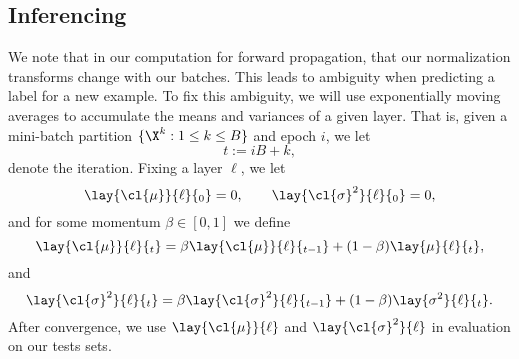 \begin{comment}
\begin{remark}
	Note that it may seem that $\mu$ and $\sigma$ depend on the variable $z$, but they actually depend on the full set of potential values, and are hence constants.  NOT TRUE
\end{remark}






	
\end{comment}



\subsection{Inferencing}
We note that in our computation for forward propagation, that our normalization transforms change with our batches.  This leads to ambiguity when predicting a label for a new example.  To fix this ambiguity, we will use exponentially moving averages to accumulate the means and variances of a given layer.  That is, given a mini-batch partition $\{\X^k:1\leq k \leq B\}$ and epoch $i$, we let
$$t:=iB + k,$$
denote the iteration.  Fixing a layer $\ell$, we let
$$\lay{\cl{\mu}}{\ell}{_0}=0,\qquad\lay{\cl{\sigma}^2}{\ell}{_0}=0,$$
and for some momentum $\beta\in[0,1]$ we define
$$\lay{\cl{\mu}}{\ell}{_t}=\beta\lay{\cl{\mu}}{\ell}{_{t-1}}+(1-\beta)\lay{\mu}{\ell}{_t},$$
and
$$\lay{\cl{\sigma}^2}{\ell}{_t}=\beta\lay{\cl{\sigma}^2}{\ell}{_{t-1}}+(1-\beta)\lay{\sigma^2}{\ell}{_t}.$$
After convergence, we use $\lay{\cl{\mu}}{\ell}$ and $\lay{\cl{\sigma}^2}{\ell}$ in evaluation on our tests sets.




\begin{comment}
\subsection{Inferencing - OLD}
We note that in our computation for forward propagation, that our normalization transforms change with our batches.  This leads to ambiguity when predicting a label for a new example.  One fix would be to average our means and variances over our batches.  That is, suppose during our iteration process, we have training-batches of the form $\{\X^k:1\leq k\leq K\}$, where each $\X^k$ has cardinality $|\X^k|=n$.  Then for each hidden-layer $\ell\in\{1,...,L-1\}$, we obtain the means
$$\lay{\mu}{\ell}{_k}=\frac{1}{n}\sum_{x\in\X^k}\lay{z}{\ell},$$
and the variances
$$\lay{\sigma^2}{\ell}{_k}=\frac{1}{n}\sum_{x\in\X^k}(\lay{z}{\ell}-\lay{\mu}{\ell}{_k})^2.$$
That is, for each hidden-layer $\ell$, we have the collection
$$\{\lay{\mu}{\ell}{_k}:1\leq k\leq K\}$$
from which we average again to obtain
$$\lay{\mu}{\ell}:=\frac{1}{K}\sum_{k=1}^K\lay{\mu}{\ell}{_k},$$
and the collection
$$\{\lay{\sigma^2}{\ell}{_k}:1\leq k\leq K\},$$
from which we use the unbiased estimate
$$\lay{\sigma^2}{\ell}:=\frac{n}{n-1}\frac{1}{K}\sum_{k=1}^K\lay{\sigma^2}{\ell}{_k}.$$
These quantities are what we use when computing the batch-normalization transforms of the hidden units for new examples.
\end{comment}





